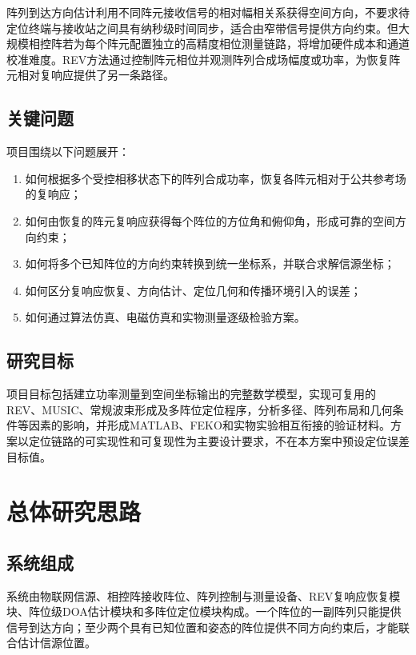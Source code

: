 \documentclass[UTF8,a4paper,12pt]{ctexart}
\begin{document}
阵列到达方向估计利用不同阵元接收信号的相对幅相关系获得空间方向，不要求待定位终端与接收站之间具有纳秒级时间同步，适合由窄带信号提供方向约束。但大规模相控阵若为每个阵元配置独立的高精度相位测量链路，将增加硬件成本和通道校准难度。REV方法通过控制阵元相位并观测阵列合成场幅度或功率，为恢复阵元相对复响应提供了另一条路径。

\subsection{关键问题}

项目围绕以下问题展开：

\begin{enumerate}
  \item 如何根据多个受控相移状态下的阵列合成功率，恢复各阵元相对于公共参考场的复响应；
  \item 如何由恢复的阵元复响应获得每个阵位的方位角和俯仰角，形成可靠的空间方向约束；
  \item 如何将多个已知阵位的方向约束转换到统一坐标系，并联合求解信源坐标；
  \item 如何区分复响应恢复、方向估计、定位几何和传播环境引入的误差；
  \item 如何通过算法仿真、电磁仿真和实物测量逐级检验方案。
\end{enumerate}

\subsection{研究目标}

项目目标包括建立功率测量到空间坐标输出的完整数学模型，实现可复用的REV、MUSIC、常规波束形成及多阵位定位程序，分析多径、阵列布局和几何条件等因素的影响，并形成MATLAB、FEKO和实物实验相互衔接的验证材料。方案以定位链路的可实现性和可复现性为主要设计要求，不在本方案中预设定位误差目标值。

\section{总体研究思路}

\subsection{系统组成}

系统由物联网信源、相控阵接收阵位、阵列控制与测量设备、REV复响应恢复模块、阵位级DOA估计模块和多阵位定位模块构成。一个阵位的一副阵列只能提供信号到达方向；至少两个具有已知位置和姿态的阵位提供不同方向约束后，才能联合估计信源位置。
\end{document}
